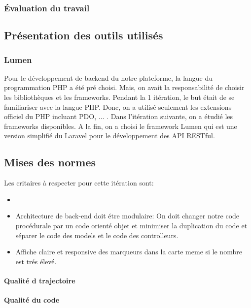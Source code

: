 \subsubsection{Évaluation du travail}
\subsection{Présentation des outils utilisés}

\subsubsection{Lumen}

Pour le développement de backend du notre plateforme, la langue du programmation
PHP a été pré choisi. Mais, on avait la responsabilité de choisir les
bibliothèques et les frameworks. Pendant la 1\iere{} itération, le but était de
se familiariser avec la langue PHP. Donc, on a utilisé seulement les extensions
officiel du PHP incluant PDO, $\dotsc$ . Dans l'itération suivante, on a étudié
les frameworks disponibles. A la fin, on a choisi le framework Lumen qui est
une version simplifié du Laravel pour le développement des API \acrshort{RESTful}.


\subsection{Mises des normes}

Les critaires à respecter pour cette itération sont:

\begin{itemize}
        \item {}
        \item Architecture de back-end doit étre modulaire: On doit changer
            notre code procédurale par un code orienté objet et minimiser la
            duplication du code et séparer le code des models et le code des
            controlleurs.
        \item Affiche claire et responsive des marqueurs dans la carte meme si
            le nombre est trés élevé.
\end{itemize}


\paragraph{Qualité d trajectoire}

\paragraph{Qualité du code}

